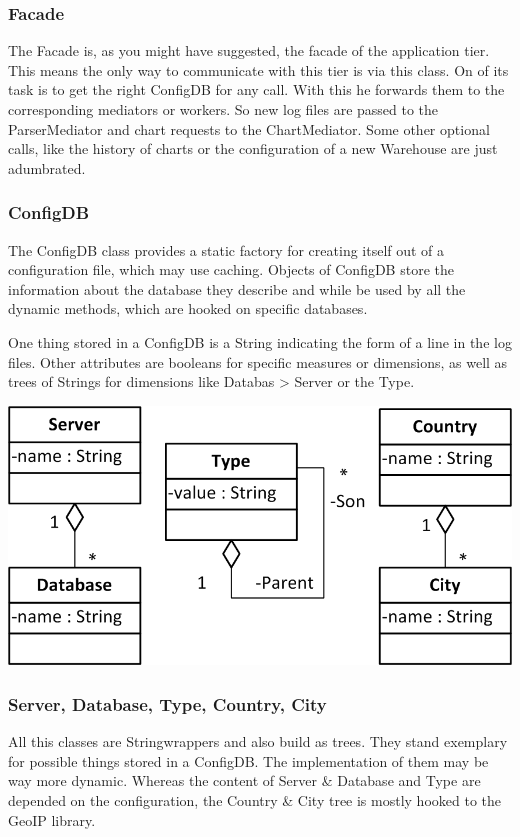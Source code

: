 \subsubsection*{Facade}
The Facade is, as you might have suggested, the facade of the application tier. 
This means the only way to communicate with this tier is via this class.
On of its task is to get the right ConfigDB for any call. With this he forwards
them to the corresponding mediators or workers. So new log files are passed to
the ParserMediator and chart requests to the ChartMediator. Some other optional
calls, like the history of charts or the configuration of a new Warehouse are just
adumbrated.


\subsubsection*{ConfigDB}
The ConfigDB class provides a static factory for creating itself out of a configuration
file, which may use caching. Objects of ConfigDB store the information about the database
they describe and while be used by all the dynamic methods, which are hooked on specific
databases. 

One thing stored in a ConfigDB is a String indicating the form of a line in the log files.
Other attributes are booleans for specific measures or dimensions, as well as trees of
Strings for dimensions like Databas > Server or the Type.


\begin{center}
\includegraphics{Pictures/Parts/Strings.png}
\end{center}  
\subsubsection*{Server, Database, Type, Country, City}
All this classes are Stringwrappers and also build as trees. They stand exemplary for
possible things stored in a ConfigDB. The implementation of them may be way more dynamic.
Whereas the content of Server \& Database and Type are depended on the configuration,
the Country \& City tree is mostly hooked to the GeoIP library.


